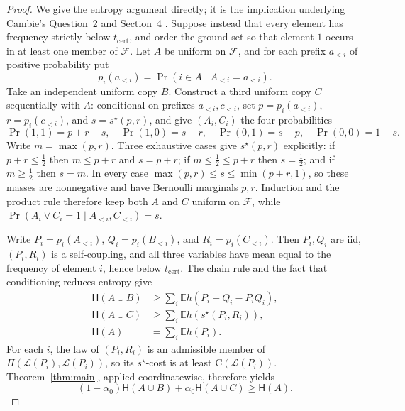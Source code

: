 \documentclass[11pt]{article}
\theoremstyle{plain}
\theoremstyle{definition}
\theoremstyle{remark}
\newcommand{\sstar}{s^{\star}}
\newcommand{\Cc}{\mathrm{C}}
\begin{document}
\begin{proof}
We give the entropy argument directly; it is the implication underlying
Cambie's Question~2 and Section~4 \cite{cambie}.  Suppose instead that every
element has frequency strictly below \(t_{\mathrm{cert}}\), and order the
ground set so that element \(1\) occurs in at least one member of
\(\mathcal F\).  Let \(A\) be uniform on \(\mathcal F\), and for each prefix
\(a_{<i}\) of positive probability put
\[
p_i(a_{<i})=\Pr(i\in A\mid A_{<i}=a_{<i}).
\]
Take an independent uniform copy \(B\).  Construct a third uniform copy \(C\)
sequentially with \(A\): conditional on prefixes \(a_{<i},c_{<i}\), set
\(p=p_i(a_{<i})\), \(r=p_i(c_{<i})\), and \(s=\sstar(p,r)\), and give
\((A_i,C_i)\) the four probabilities
\[
\Pr(1,1)=p+r-s,\quad
\Pr(1,0)=s-r,\quad
\Pr(0,1)=s-p,\quad
\Pr(0,0)=1-s.
\]
Write $m=\max(p,r)$.  Three exhaustive cases give
$\sstar(p,r)$ explicitly: if $p+r\le\frac12$ then $m\le p+r$ and
$s=p+r$; if $m\le\frac12\le p+r$ then $s=\frac12$; and if $m\ge\frac12$ then
$s=m$.  In every case
\(\max(p,r)\le s\le\min(p+r,1)\), so these masses are nonnegative and have
Bernoulli marginals \(p,r\).  Induction and the product rule therefore keep
both \(A\) and \(C\) uniform on \(\mathcal F\), while
\(\Pr(A_i\vee C_i=1\mid A_{<i},C_{<i})=s\).

Write \(P_i=p_i(A_{<i})\), \(Q_i=p_i(B_{<i})\), and
\(R_i=p_i(C_{<i})\).  Then \(P_i,Q_i\) are iid, \((P_i,R_i)\) is a
self-coupling, and all three variables have mean equal to the frequency of
element \(i\), hence below \(t_{\mathrm{cert}}\).  The chain rule and the fact
that conditioning reduces entropy give
\begin{align*}
\mathsf H(A\cup B)
&\ge\sum_i\mathbb E h(P_i+Q_i-P_iQ_i),\\
\mathsf H(A\cup C)
&\ge\sum_i\mathbb E h(\sstar(P_i,R_i)),\\
\mathsf H(A)&=\sum_i\mathbb E h(P_i).
\end{align*}
For each \(i\), the law of \((P_i,R_i)\) is an admissible member of
\(\Pi(\mathcal L(P_i),\mathcal L(P_i))\), so its \(\sstar\)-cost is at least
\(\Cc(\mathcal L(P_i))\).
Theorem~\ref{thm:main}, applied coordinatewise, therefore yields
\[
(1-\alpha_0)\mathsf H(A\cup B)+\alpha_0\mathsf H(A\cup C)
\ge\mathsf H(A).
\]


\end{proof}
\end{document}
